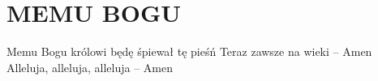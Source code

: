 \documentclass[../../../songbook.tex]{subfiles}
\begin{document}
\TabPositions{8cm} %
\section*{MEMU BOGU}
{}
\vspace{0.5cm}
Memu Bogu królowi będę śpiewał tę pieśń		 \newline	 
Teraz zawsze na wieki – Amen				\newline
Alleluja, alleluja, alleluja – Amen			 \newline
\end{document}

